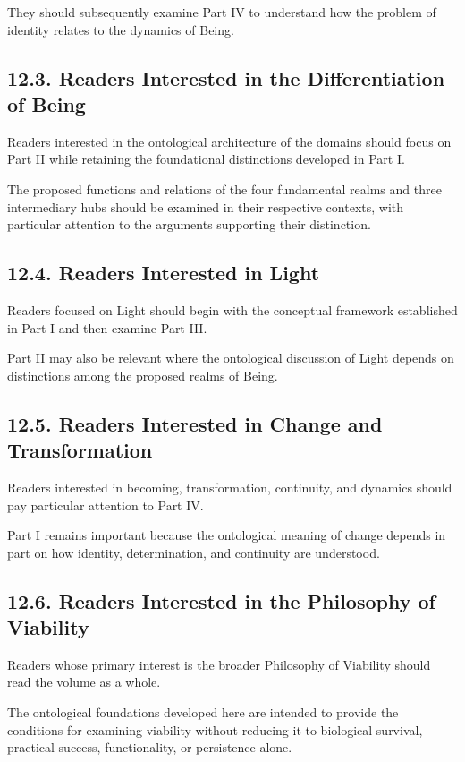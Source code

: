 They should subsequently examine
Part IV to understand how the problem
of identity relates to the dynamics
of Being.

\subsection*{12.3. Readers Interested in the
Differentiation of Being}

Readers interested in the ontological
architecture of the domains should
focus on Part II while retaining the
foundational distinctions developed
in Part I.

The proposed functions and relations
of the four fundamental realms and
three intermediary hubs should be
examined in their respective contexts,
with particular attention to the
arguments supporting their distinction.

\subsection*{12.4. Readers Interested in Light}

Readers focused on Light should begin
with the conceptual framework established
in Part I and then examine Part III.

Part II may also be relevant where
the ontological discussion of Light
depends on distinctions among the
proposed realms of Being.

\subsection*{12.5. Readers Interested in Change
and Transformation}

Readers interested in becoming,
transformation, continuity, and dynamics
should pay particular attention to Part IV.

Part I remains important because
the ontological meaning of change
depends in part on how identity,
determination, and continuity are
understood.

\subsection*{12.6. Readers Interested in the
Philosophy of Viability}

Readers whose primary interest is
the broader Philosophy of Viability
should read the volume as a whole.

The ontological foundations developed
here are intended to provide the
conditions for examining viability
without reducing it to biological
survival, practical success, functionality,
or persistence alone.

